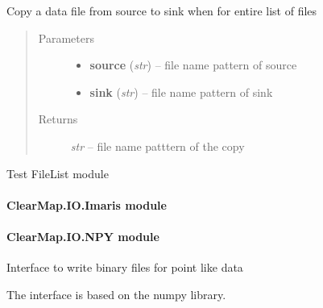 \documentclass[letterpaper,10pt,english]{sphinxmanual}
\begin{document}

\begin{fulllineitems}
\label{api/ClearMap.IO:ClearMap.IO.FileList.copyData}
Copy a data file from source to sink when for entire list of files
\begin{quote}\begin{description}
\item[{Parameters}] \leavevmode\begin{itemize}
\item {} 
\textbf{source} (\emph{str}) --
file name pattern of source

\item {} 
\textbf{sink} (\emph{str}) --
file name pattern of sink

\end{itemize}

\item[{Returns}] \leavevmode
\emph{str} --
file name patttern of the copy

\end{description}\end{quote}

\end{fulllineitems}


\begin{fulllineitems}
\label{api/ClearMap.IO:ClearMap.IO.FileList.test}
Test FileList module

\end{fulllineitems}



\paragraph{ClearMap.IO.Imaris module}
\label{api/ClearMap.IO:clearmap-io-imaris-module}

\paragraph{ClearMap.IO.NPY module}
\label{api/ClearMap.IO:clearmap-io-npy-module}\label{api/ClearMap.IO:module-ClearMap.IO.NPY}
Interface to write binary files for point like data

The interface is based on the numpy library.
\end{document}
